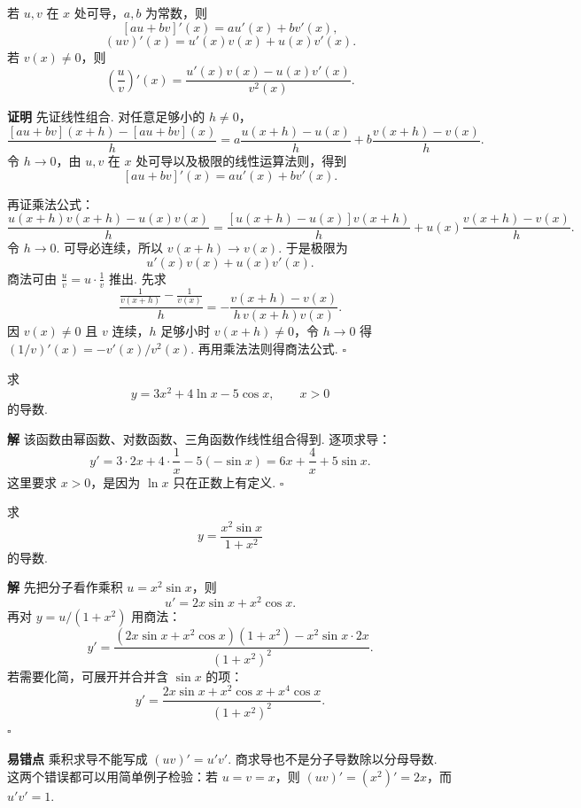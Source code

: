 \documentclass[fontset=fandol]{ctexart}
\newenvironment{proofdetail}{\par\noindent\textbf{证明}\quad}{\hfill$\square$\par\vspace{0.8em}}
\newenvironment{solution}{\par\noindent\textbf{解}\quad}{\hfill$\square$\par\vspace{0.8em}}
\newenvironment{warning}{\par\noindent\textbf{易错点}\quad}{\par\vspace{0.8em}}
\begin{document}
\begin{theorem}
若 $u,v$ 在 $x$ 处可导，$a,b$ 为常数，则
\[
[au+bv]'(x)=au'(x)+bv'(x),
\]
\[
(uv)'(x)=u'(x)v(x)+u(x)v'(x).
\]
若 $v(x)\neq0$，则
\[
\left(\frac{u}{v}\right)'(x)=\frac{u'(x)v(x)-u(x)v'(x)}{v^2(x)}.
\]
\end{theorem}
\begin{proofdetail}
先证线性组合. 对任意足够小的 $h\neq0$，
\[
\frac{[au+bv](x+h)-[au+bv](x)}{h}
=a\frac{u(x+h)-u(x)}{h}
+b\frac{v(x+h)-v(x)}{h}.
\]
令 $h\to0$，由 $u,v$ 在 $x$ 处可导以及极限的线性运算法则，得到
\[
[au+bv]'(x)=au'(x)+bv'(x).
\]

再证乘法公式：
\[
\frac{u(x+h)v(x+h)-u(x)v(x)}{h}
=\frac{[u(x+h)-u(x)]v(x+h)}{h}+u(x)\frac{v(x+h)-v(x)}{h}.
\]
令 $h\to0$. 可导必连续，所以 $v(x+h)\to v(x)$. 于是极限为
\[
u'(x)v(x)+u(x)v'(x).
\]
商法可由 $\frac{u}{v}=u\cdot\frac1v$ 推出. 先求
\[
\frac{\frac1{v(x+h)}-\frac1{v(x)}}{h}
=-\frac{v(x+h)-v(x)}{h\,v(x+h)v(x)}.
\]
因 $v(x)\neq0$ 且 $v$ 连续，$h$ 足够小时 $v(x+h)\neq0$，令 $h\to0$ 得 $(1/v)'(x)=-v'(x)/v^2(x)$. 再用乘法法则得商法公式.
\end{proofdetail}

\begin{example}[线性组合求导]
求
\[
y=3x^2+4\ln x-5\cos x,\qquad x>0
\]
的导数.
\end{example}
\begin{solution}
该函数由幂函数、对数函数、三角函数作线性组合得到. 逐项求导：
\[
y'=3\cdot 2x+4\cdot\frac1x-5(-\sin x)
=6x+\frac4x+5\sin x.
\]
这里要求 $x>0$，是因为 $\ln x$ 只在正数上有定义.
\end{solution}

\begin{example}[乘积与商的求导]
求
\[
y=\frac{x^2\sin x}{1+x^2}
\]
的导数.
\end{example}
\begin{solution}
先把分子看作乘积 $u=x^2\sin x$，则
\[
u'=2x\sin x+x^2\cos x.
\]
再对 $y=u/(1+x^2)$ 用商法：
\[
y'=\frac{(2x\sin x+x^2\cos x)(1+x^2)-x^2\sin x\cdot2x}{(1+x^2)^2}.
\]
若需要化简，可展开并合并含 $\sin x$ 的项：
\[
y'=\frac{2x\sin x+x^2\cos x+x^4\cos x}{(1+x^2)^2}.
\]
\end{solution}
\begin{warning}
乘积求导不能写成 $(uv)'=u'v'$. 商求导也不是分子导数除以分母导数. 这两个错误都可以用简单例子检验：若 $u=v=x$，则 $(uv)'=(x^2)'=2x$，而 $u'v'=1$.
\end{warning}
\end{document}
